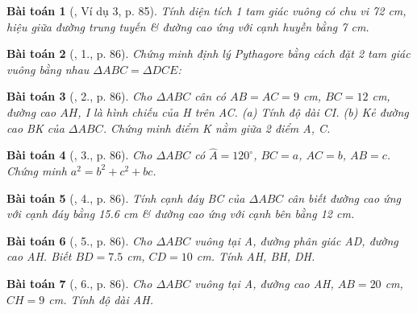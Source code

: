 \documentclass{article}
\newtheorem{baitoan}{Bài toán}
\begin{document}
\begin{baitoan}[\cite{Binh_Toan_9_tap_1}, Ví dụ 3, p. 85]
	Tính diện tích 1 tam giác vuông có chu vi {\rm72 cm}, hiệu giữa đường trung tuyến \& đường cao ứng với cạnh huyền bằng {\rm7 cm}.
\end{baitoan}

\begin{baitoan}[\cite{Binh_Toan_9_tap_1}, 1., p. 86]
	Chứng minh định lý Pythagore bằng cách đặt 2 tam giác vuông bằng nhau $\Delta ABC = \Delta DCE$:
	\begin{center}
	\end{center}
\end{baitoan}

\begin{baitoan}[\cite{Binh_Toan_9_tap_1}, 2., p. 86]
	Cho $\Delta ABC$ cân có $AB = AC = 9$ {\rm cm}, $BC = 12$ {\rm cm}, đường cao $AH$, I là hình chiếu của H trên AC. (a) Tính độ dài CI. (b) Kẻ đường cao BK của $\Delta ABC$. Chứng minh điểm K nằm giữa 2 điểm A, C.
\end{baitoan}

\begin{baitoan}[\cite{Binh_Toan_9_tap_1}, 3., p. 86]
	Cho $\Delta ABC$ có $\widehat{A} = 120^\circ$, $BC = a$, $AC = b$, $AB = c$. Chứng minh $a^2 = b^2 + c^2 + bc$.
\end{baitoan}

\begin{baitoan}[\cite{Binh_Toan_9_tap_1}, 4., p. 86]
	Tính cạnh đáy BC của $\Delta ABC$ cân biết đường cao ứng với cạnh đáy bằng {\rm15.6 cm} \& đường cao ứng với cạnh bên bằng {\rm12 cm}.
\end{baitoan}

\begin{baitoan}[\cite{Binh_Toan_9_tap_1}, 5., p. 86]
	Cho $\Delta ABC$ vuông tại A, đường phân giác AD, đường cao AH. Biết $BD = 7.5$ {\rm cm}, $CD = 10$ {\rm cm}. Tính AH, BH, DH.
\end{baitoan}

\begin{baitoan}[\cite{Binh_Toan_9_tap_1}, 6., p. 86]
	Cho $\Delta ABC$ vuông tại A, đường cao AH, $AB = 20$ {\rm cm}, $CH = 9$ {\rm cm}. Tính độ dài AH.
\end{baitoan}
\end{document}
